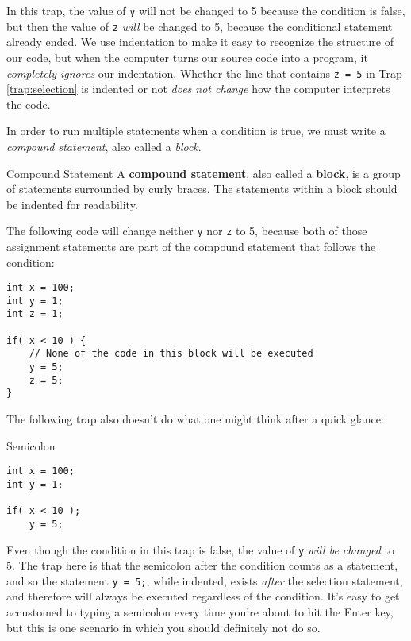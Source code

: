 In this trap, the value of \texttt{y} will not be changed to 5 because the condition is false, but then the value of \texttt{z} \textit{will} be changed to 5, because the conditional statement already ended.  We use indentation to make it easy to recognize the structure of our code, but when the computer turns our source code into a program, it \textit{completely ignores} our indentation.  Whether the line that contains \texttt{z = 5} in Trap \ref{trap:selection} is indented or not \textit{does not change} how the computer interprets the code.

In order to run multiple statements when a condition is true, we must write a \textit{compound statement}, also called a \textit{block}.

\begin{defn}{Compound Statement}
A \textbf{compound statement}, also called a \textbf{block}, is a group of statements surrounded by curly braces.  The statements within a block should be indented for readability.
\end{defn}

The following code will change neither \texttt{y} nor \texttt{z} to 5, because both of those assignment statements are part of the compound statement that follows the condition:

\begin{verbatim}
int x = 100;
int y = 1;
int z = 1;

if( x < 10 ) {
    // None of the code in this block will be executed
    y = 5;
    z = 5;
}
\end{verbatim}

The following trap also doesn't do what one might think after a quick glance:

\begin{trap}{Semicolon}
\label{trap:semicolon}
\begin{verbatim}
int x = 100;
int y = 1;

if( x < 10 );
    y = 5;
\end{verbatim}
\end{trap}

Even though the condition in this trap is false, the value of \texttt{y} \textit{will be changed} to 5.  The trap here is that the semicolon after the condition counts as a statement, and so the statement \texttt{y = 5;}, while indented, exists \textit{after} the selection statement, and therefore will always be executed regardless of the condition.  It's easy to get accustomed to typing a semicolon every time you're about to hit the Enter key, but this is one scenario in which you should definitely not do so.

